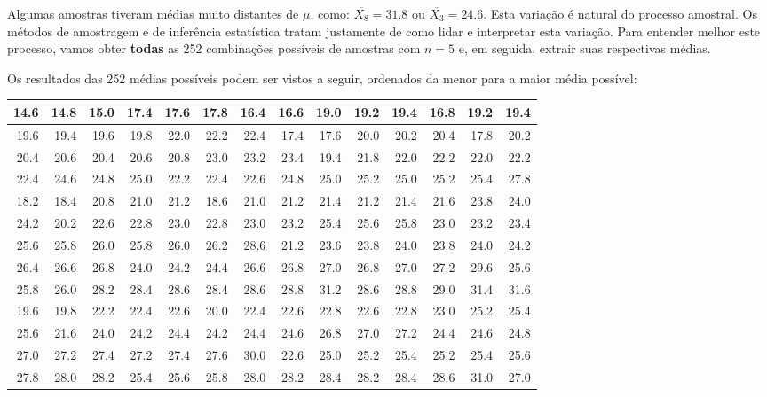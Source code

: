 \documentclass[
]{book}
\begin{document}
Algumas amostras tiveram médias muito distantes de \(\mu\), como: \(\overline{X_{8}} = 31.8\) ou \(\overline{X_{3}} = 24.6\). Esta variação é natural do processo amostral. Os métodos de amostragem e de inferência estatística tratam justamente de como lidar e interpretar esta variação. Para entender melhor este processo, vamos obter \textbf{todas} as 252 combinações possíveis de amostras com \(n = 5\) e, em seguida, extrair suas respectivas médias.

Os resultados das 252 médias possíveis podem ser vistos a seguir, ordenados da menor para a maior média possível:

\begin{tabular}{r|r|r|r|r|r|r|r|r|r|r|r|r|r}
\hline
14.6 & 14.8 & 15.0 & 17.4 & 17.6 & 17.8 & 16.4 & 16.6 & 19.0 & 19.2 & 19.4 & 16.8 & 19.2 & 19.4\\
\hline
19.6 & 19.4 & 19.6 & 19.8 & 22.0 & 22.2 & 22.4 & 17.4 & 17.6 & 20.0 & 20.2 & 20.4 & 17.8 & 20.2\\
\hline
20.4 & 20.6 & 20.4 & 20.6 & 20.8 & 23.0 & 23.2 & 23.4 & 19.4 & 21.8 & 22.0 & 22.2 & 22.0 & 22.2\\
\hline
22.4 & 24.6 & 24.8 & 25.0 & 22.2 & 22.4 & 22.6 & 24.8 & 25.0 & 25.2 & 25.0 & 25.2 & 25.4 & 27.8\\
\hline
18.2 & 18.4 & 20.8 & 21.0 & 21.2 & 18.6 & 21.0 & 21.2 & 21.4 & 21.2 & 21.4 & 21.6 & 23.8 & 24.0\\
\hline
24.2 & 20.2 & 22.6 & 22.8 & 23.0 & 22.8 & 23.0 & 23.2 & 25.4 & 25.6 & 25.8 & 23.0 & 23.2 & 23.4\\
\hline
25.6 & 25.8 & 26.0 & 25.8 & 26.0 & 26.2 & 28.6 & 21.2 & 23.6 & 23.8 & 24.0 & 23.8 & 24.0 & 24.2\\
\hline
26.4 & 26.6 & 26.8 & 24.0 & 24.2 & 24.4 & 26.6 & 26.8 & 27.0 & 26.8 & 27.0 & 27.2 & 29.6 & 25.6\\
\hline
25.8 & 26.0 & 28.2 & 28.4 & 28.6 & 28.4 & 28.6 & 28.8 & 31.2 & 28.6 & 28.8 & 29.0 & 31.4 & 31.6\\
\hline
19.6 & 19.8 & 22.2 & 22.4 & 22.6 & 20.0 & 22.4 & 22.6 & 22.8 & 22.6 & 22.8 & 23.0 & 25.2 & 25.4\\
\hline
25.6 & 21.6 & 24.0 & 24.2 & 24.4 & 24.2 & 24.4 & 24.6 & 26.8 & 27.0 & 27.2 & 24.4 & 24.6 & 24.8\\
\hline
27.0 & 27.2 & 27.4 & 27.2 & 27.4 & 27.6 & 30.0 & 22.6 & 25.0 & 25.2 & 25.4 & 25.2 & 25.4 & 25.6\\
\hline
27.8 & 28.0 & 28.2 & 25.4 & 25.6 & 25.8 & 28.0 & 28.2 & 28.4 & 28.2 & 28.4 & 28.6 & 31.0 & 27.0\\

\end{tabular}
\end{document}
